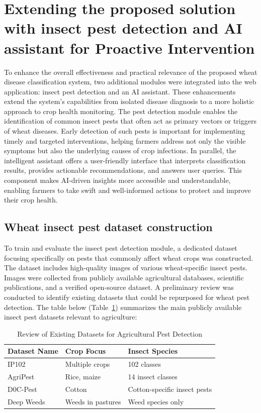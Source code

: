 \section{Extending the proposed solution with insect pest detection and AI assistant for Proactive Intervention}
To enhance the overall effectiveness and practical relevance of the proposed wheat disease classification system, two additional modules were integrated into the web application: insect pest detection and an AI assistant. These enhancements extend the system’s capabilities from isolated disease diagnosis to a more holistic approach to crop health monitoring.
The pest detection module enables the identification of common insect pests that often act as primary vectors or triggers of wheat diseases. Early detection of such pests is important for implementing timely and targeted interventions, helping farmers address not only the visible symptoms but also the underlying causes of crop infections.
In parallel, the intelligent assistant offers a user-friendly interface that interprets classification results, provides actionable recommendations, and answers user queries. This component makes AI-driven insights more accessible and understandable, enabling farmers to take swift and well-informed actions to protect and improve their crop health.

\subsection{Wheat insect pest dataset construction}

To train and evaluate the insect pest detection module, a dedicated dataset focusing specifically on pests that commonly affect wheat crops was constructed. The dataset includes high-quality images of various wheat-specific insect pests. Images were collected from publicly available agricultural databases, scientific publications, and a verified open-source dataset.
A preliminary review was conducted to identify existing datasets that could be repurposed for wheat pest detection. The table below (Table~\ref{tab:agricultural-pest-datasets}) summarizes the main publicly available insect pest datasets relevant to agriculture:

\begin{table}[htbp]
    \caption{Review of Existing Datasets for Agricultural Pest Detection}
    \centering
    \begin{tabular}{|p{4cm}|p{4cm}|p{5cm}|}
    \hline
    \textbf{Dataset Name} & \textbf{Crop Focus} & \textbf{Insect Species} \\
    \hline
    IP102 & Multiple crops & 102 classes \\
    \hline
    AgriPest & Rice, maize & 14 insect classes \\
    \hline
    D0C-Pest & Cotton & Cotton-specific insect pests \\
    \hline
    Deep Weeds & Weeds in pastures & Weed species only \\
    \hline
    \end{tabular}
    \label{tab:agricultural-pest-datasets}
\end{table}


